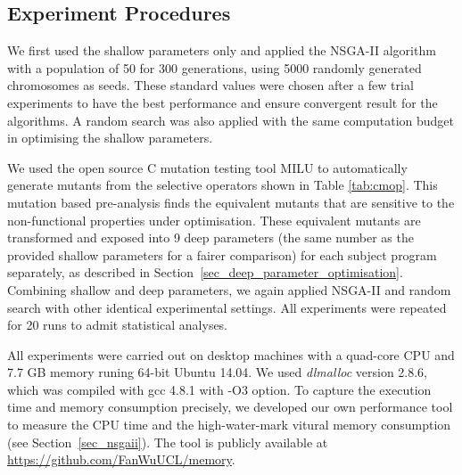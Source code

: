 \begin{table}[tbhp]
\centering
\caption{Subject applications}
\label{tab_sub_app}
\end{table}

\subsection{Experiment Procedures}

We first used the shallow parameters only and applied the NSGA-II algorithm
with a population of 50 for 300 generations, using 5000 randomly generated
chromosomes as seeds. 
These standard values were chosen after a few trial experiments to have the best performance and ensure convergent result for the algorithms. 
A random search was also applied with the same computation budget in optimising the shallow parameters. 

We used the open source C mutation testing tool MILU \cite{Harman:2011:SHO:2025113.2025144,JiaH08a} to automatically generate mutants from the selective operators shown in Table \ref{tab:cmop}. This mutation based pre-analysis finds the equivalent mutants that are sensitive to the non-functional properties under optimisation. These equivalent mutants are transformed and exposed into 9 deep parameters (the same number as the provided shallow parameters for a fairer comparison) for each subject program separately, as described in Section~\ref{sec_deep_parameter_optimisation}. Combining shallow and deep parameters, we again applied NSGA-II and random search with other identical experimental settings. All experiments were repeated for 20 runs to admit statistical analyses. 

All experiments were carried out on desktop machines with a quad-core CPU and 7.7 GB memory runing 64-bit Ubuntu 14.04. We used \emph{dlmalloc} version 2.8.6, which was compiled with gcc 4.8.1 with -O3 option. To capture the execution time and memory consumption precisely, we developed our own performance tool to measure the CPU time and the high-water-mark vitural memory consumption (see Section~\ref{sec_nsgaii}). The tool is publicly available at \url{https://github.com/FanWuUCL/memory}.

